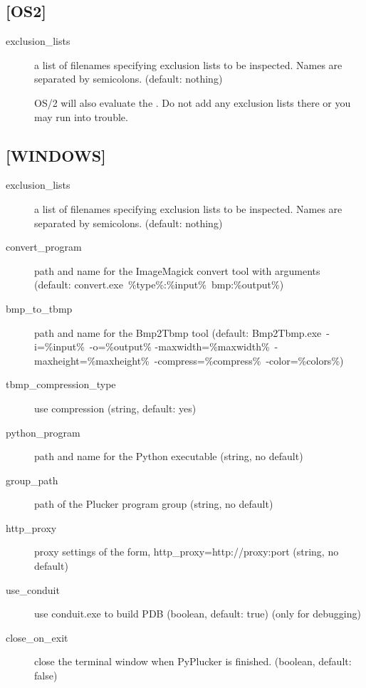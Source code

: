 \subsection{[OS2]}

\begin{description}
\item[exclusion\_lists] a list of filenames specifying exclusion lists to 
be inspected.  Names are separated by semicolons. (default: nothing)

\note OS/2 will also evaluate the . Do not add any exclusion lists there or you may run
into trouble.

\end{description}


\subsection{[WINDOWS]}

\begin{description}
\item[exclusion\_lists] a list of filenames specifying exclusion lists to 
be inspected.  Names are separated by semicolons. (default: nothing)
\item[convert\_program] path and name for the ImageMagick convert tool
with arguments\\
 (default: \mbox{convert.exe \%type\%:\%input\% bmp:\%output\%})
\item[bmp\_to\_tbmp] path and name for the Bmp2Tbmp tool
(default: \mbox{Bmp2Tbmp.exe -i=\%input\% -o=\%output\%}
 \mbox{-maxwidth=\%maxwidth\% -maxheight=\%maxheight\% -compress=\%compress\% -color=\%colors\%})
\item[tbmp\_compression\_type] use compression (string, default: yes)
\item[python\_program] path and name for the Python executable
(string, no default)
\item[group\_path] path of the Plucker program group (string, no default)
\item[http\_proxy] proxy settings of the form, http\_proxy=http://proxy:port
(string, no default)
\item[use\_conduit] use conduit.exe to build PDB (boolean, default: true)
(only for debugging)
\item[close\_on\_exit] close the terminal window when PyPlucker is finished.
(boolean, default: false)
\end{description}

